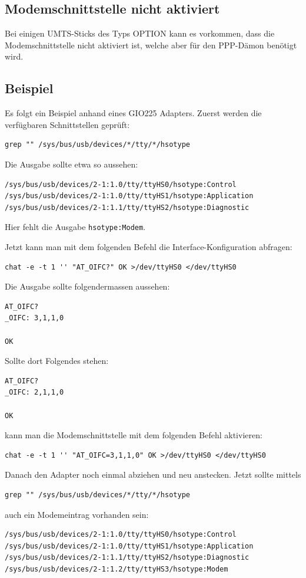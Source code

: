 \subsection{Modemschnittstelle nicht aktiviert}

Bei einigen UMTS-Sticks des Typs OPTION kann es vorkommen, dass die
Modemschnittstelle nicht aktiviert ist, welche aber für den PPP-Dämon benötigt
wird.

\subsection{Beispiel}

Es folgt ein Beispiel anhand eines GIO225 Adapters. Zuerst werden die
verfügbaren Schnittstellen geprüft:
\begin{verbatim}
grep "" /sys/bus/usb/devices/*/tty/*/hsotype
\end{verbatim}

Die Ausgabe sollte etwa so aussehen:
\begin{verbatim}
/sys/bus/usb/devices/2-1:1.0/tty/ttyHS0/hsotype:Control
/sys/bus/usb/devices/2-1:1.0/tty/ttyHS1/hsotype:Application
/sys/bus/usb/devices/2-1:1.1/tty/ttyHS2/hsotype:Diagnostic
\end{verbatim}

Hier fehlt die Ausgabe \verb+hsotype:Modem+.

Jetzt kann man mit dem folgenden Befehl die Interface-Konfiguration
abfragen:
\begin{verbatim}
chat -e -t 1 '' "AT_OIFC?" OK >/dev/ttyHS0 </dev/ttyHS0
\end{verbatim}

Die Ausgabe sollte folgendermassen aussehen:
\begin{verbatim}
AT_OIFC?
_OIFC: 3,1,1,0

OK
\end{verbatim}

Sollte dort Folgendes stehen:
\begin{verbatim}
AT_OIFC?
_OIFC: 2,1,1,0

OK
\end{verbatim}

kann man die Modemschnittstelle mit dem folgenden Befehl aktivieren:
\begin{verbatim}
chat -e -t 1 '' "AT_OIFC=3,1,1,0" OK >/dev/ttyHS0 </dev/ttyHS0
\end{verbatim}

Danach den Adapter noch einmal abziehen und neu anstecken.
Jetzt sollte mittels
\begin{verbatim}
grep "" /sys/bus/usb/devices/*/tty/*/hsotype
\end{verbatim}

auch ein Modemeintrag vorhanden sein:
\begin{verbatim}
/sys/bus/usb/devices/2-1:1.0/tty/ttyHS0/hsotype:Control
/sys/bus/usb/devices/2-1:1.0/tty/ttyHS1/hsotype:Application
/sys/bus/usb/devices/2-1:1.1/tty/ttyHS2/hsotype:Diagnostic
/sys/bus/usb/devices/2-1:1.2/tty/ttyHS3/hsotype:Modem
\end{verbatim}
